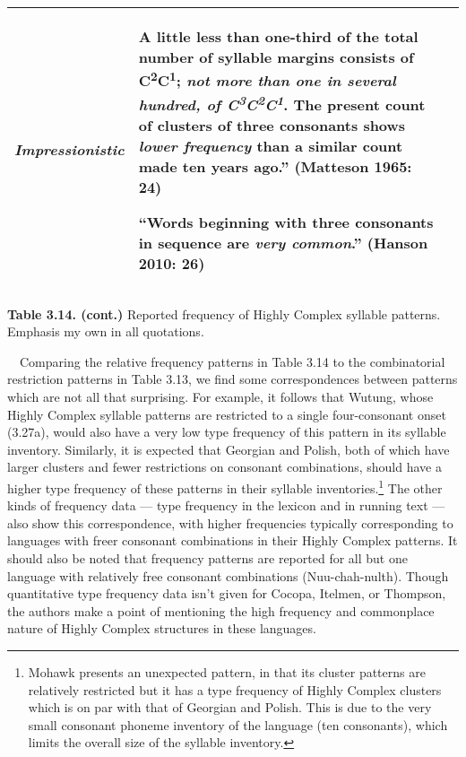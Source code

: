 \documentclass[12pt]{article}
\newenvironment{styleBody}{\renewcommand\baselinestretch{1.0}\setlength\leftskip{0in}\setlength\rightskip{0in plus 1fil}\setlength\parindent{0in}\setlength\parfillskip{0pt plus 1fil}\setlength\parskip{0in plus 1pt}\writerlistparindent\writerlistleftskip\leavevmode\normalfont\normalsize\fontsize{11pt}{13.2pt}\selectfont\mdseries\upshape\writerlistlabel\ignorespaces}{\unskip\vspace{0in plus 1pt}\par}
\newcommand\writerlistleftskip{}
\newcommand\writerlistparindent{}
\newcommand\writerlistlabel{}
\begin{document}
\begin{flushleft}
\begin{supertabular}{m{0.77125984in}m{1.0900599in}m{4.32406in}}
{\itshape Impressionistic} &
{\fontsize{10pt}{12.0pt}\selectfont\mdseries\upshape {\textquotedbl}A little less than one-third of the total number of syllable margins consists of C\textsuperscript{2}C\textsuperscript{1}; \textbf{\textit{not more than one in several hundred, of C}}\textbf{\textit{\textsuperscript{3}}}\textbf{\textit{C}}\textbf{\textit{\textsuperscript{2}}}\textbf{\textit{C}}\textbf{\textit{\textsuperscript{1}}}\textbf{.} The present count of clusters of three consonants shows \textbf{\textit{lower frequency}} than a similar count made ten years ago.” (Matteson 1965: 24)}

“Words beginning with three consonants in sequence are \textbf{\textit{very common}}.” (Hanson 2010: 26)\\\hline
\end{supertabular}
\end{flushleft}
\begin{styleBody}
\textbf{Table 3.14. (cont.)} Reported frequency of Highly Complex syllable patterns. Emphasis my own in all quotations.
\end{styleBody}

\begin{styleBody}
\ \ Comparing the relative frequency patterns in Table 3.14 to the combinatorial restriction patterns in Table 3.13, we find some correspondences between patterns which are not all that surprising. For example, it follows that Wutung, whose Highly Complex syllable patterns are restricted to a single four-consonant onset (3.27a), would also have a very low type frequency of this pattern in its syllable inventory. Similarly, it is expected that Georgian and Polish, both of which have larger clusters and fewer restrictions on consonant combinations, should have a higher type frequency of these patterns in their syllable inventories.\footnote{Mohawk presents an unexpected pattern, in that its cluster patterns are relatively restricted but it has a type frequency of Highly Complex clusters which is on par with that of Georgian and Polish. This is due to the very small consonant phoneme inventory of the language (ten consonants), which limits the overall size of the syllable inventory.} The other kinds of frequency data — type frequency in the lexicon and in running text — also show this correspondence, with higher frequencies typically corresponding to languages with freer consonant combinations in their Highly Complex patterns. It should also be noted that frequency patterns are reported for all but one language with relatively free consonant combinations (Nuu-chah-nulth). Though quantitative type frequency data isn’t given for Cocopa, Itelmen, or Thompson, the authors make a point of mentioning the high frequency and commonplace nature of Highly Complex structures in these languages. 
\end{styleBody}
\end{document}
